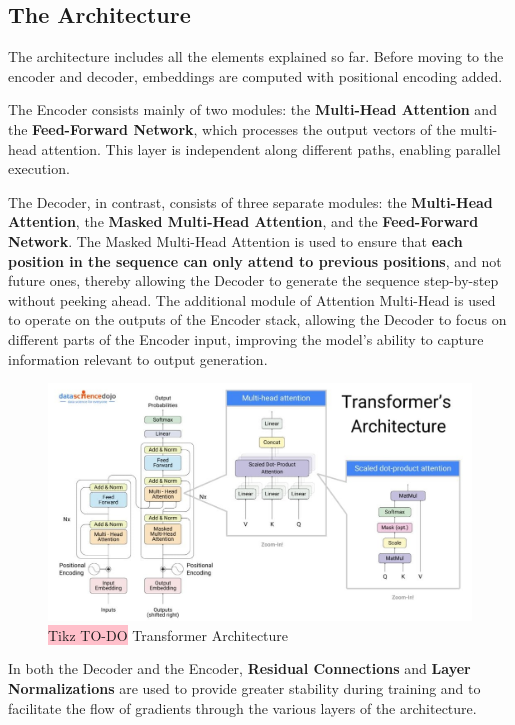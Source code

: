 \subsection{The Architecture}

The architecture includes all the elements explained so far. Before moving to the encoder and decoder, embeddings are computed with positional encoding added.

The Encoder consists mainly of two modules: the \textbf{Multi-Head Attention} and the \textbf{Feed-Forward Network}, which processes the output vectors of the multi-head attention. This layer is independent along different paths, enabling parallel execution.

The Decoder, in contrast, consists of three separate modules: the \textbf{Multi-Head Attention}, the \textbf{Masked Multi-Head Attention}, and the \textbf{Feed-Forward Network}.
The Masked Multi-Head Attention is used to ensure that \textbf{each position in the sequence can only attend to previous positions}, and not future ones, thereby allowing the Decoder to generate the sequence step-by-step without peeking ahead. The additional module of Attention Multi-Head is used to operate on the outputs of the Encoder stack, allowing the Decoder to focus on different parts of the Encoder input, improving the model's ability to capture information relevant to output generation.

\begin{figure}[!htbp]
    \centering
    \includegraphics[width=0.85\linewidth]{tikz/chapter8 - TRANSFORMERS.jpg}
    \caption{{\color{red}\colorbox{pink}{Tikz TO-DO}} Transformer Architecture}
\end{figure}

In both the Decoder and the Encoder, \textbf{Residual Connections} and \textbf{Layer Normalizations} are used to provide greater stability during training and to facilitate the flow of gradients through the various layers of the architecture.

